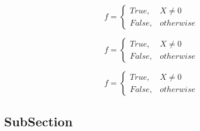 \documentclass[a4paper]{article}
\begin{document}
\begin{equation}   f =
\begin{cases} True, & X \neq 0\\
False, & otherwise
\end{cases}
\end{equation}

\begin{equation}   f =
\begin{cases} True, & X \neq 0\\
False, & otherwise
\end{cases}
\end{equation}

\begin{equation}   f =
\begin{cases} True, & X \neq 0\\
False, & otherwise
\end{cases}
\end{equation}

\subsection{SubSection}
\end{document}
